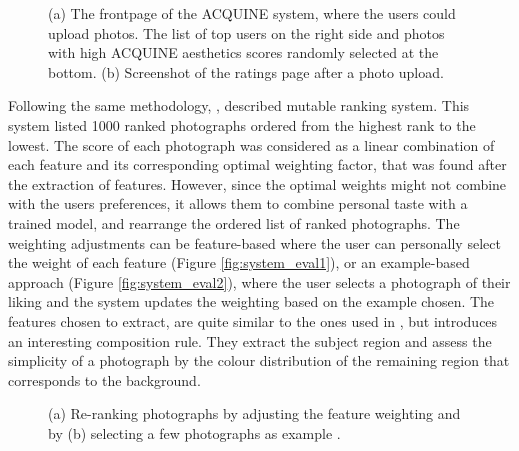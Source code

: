 \begin{figure}[htbp]
        \centering
  \caption{(a) The frontpage of the ACQUINE system, where the users could upload photos. The list of top users on the right side and photos with high ACQUINE aesthetics scores randomly selected at the bottom. (b) Screenshot of the ratings page after a photo upload. \cite{datta2010acquine}}
  \label{fig:acquine_image}
\end{figure}

Following the same methodology, \citeauthor{yeh2010personalized} \cite{yeh2010personalized}, described mutable ranking system. This system listed 1000 ranked photographs ordered from the highest rank to the lowest. The score of each photograph was considered as a linear combination of each feature and its corresponding optimal weighting factor, that was found after the extraction of features. However, since the optimal weights might not combine with the users preferences, it allows them to combine personal taste with a trained model, and rearrange the ordered list of ranked photographs.
The weighting adjustments can be feature-based where the user can personally select the weight of each feature (Figure \ref{fig:system_eval1}), or an example-based approach (Figure \ref{fig:system_eval2}), where the user selects a photograph of their liking and the system updates the weighting based on the example chosen.
The features chosen to extract, are quite similar to the ones used in \cite{datta2006studying}, but introduces an interesting composition rule. They extract the subject region and assess the simplicity of a photograph by the colour distribution of the remaining region that corresponds to the background.

\begin{figure}[htbp]
    \centering
  \caption{(a) Re-ranking photographs by adjusting the feature weighting and by (b) selecting a few photographs as example \cite{yeh2010personalized}.}
  \label{fig:system_eval_image}
\end{figure}

